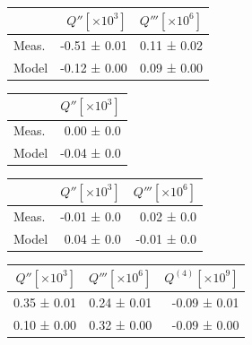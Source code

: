 \begin{figure}
    \centering
    \begin{minipage}[b]{0.49\textwidth}
        \centering
        \begin{table}
          \footnotesize
          \begin{tabular}{lrr}
            & $Q'' [\times 10^3]$ & $Q''' [\times 10^6]$ \\
            \midrule
            Meas.       &  -0.51 ± 0.01 & 0.11 ± 0.02\\
            Model       &  -0.12 ± 0.00 & 0.09 ± 0.00\\
            \bottomrule
          \end{tabular}
        \end{table}
    \end{minipage}
    \hfill
    \begin{minipage}[b]{0.49\textwidth}
        \centering
        \begin{table}
          \footnotesize
          \begin{tabular}{lr}
          & $Q'' [\times 10^3]$ \\
          \midrule
          Meas.       &  0.00 ± 0.0 \\
          Model       & -0.04 ± 0.0 \\
          \bottomrule
          \end{tabular}
        \end{table}
    \end{minipage}
\end{figure}

\begin{figure}
    \centering
    \begin{minipage}[b]{0.49\textwidth}
        \centering
        \begin{table}
          \begin{tabular}{lrr}
            & $Q'' [\times 10^3]$ & $Q''' [\times 10^6]$ \\
            \midrule
              Meas. & -0.01 ± 0.0 &  0.02 ± 0.0 \\
              Model &  0.04 ± 0.0 & -0.01 ± 0.0 \\
            \bottomrule
            \end{tabular}
        \end{table}
    \end{minipage}
    \hfill
    \begin{minipage}[b]{0.49\textwidth}
        \centering
        \begin{table}
          \begin{tabular}{rrr}
            $Q'' [\times 10^3]$ & $Q''' [\times 10^6]$ & $Q^{(4)} [\times 10^9]$ \\
            \midrule
             0.35 ± 0.01 & 0.24 ± 0.01 & -0.09 ± 0.01 \\
             0.10 ± 0.00 & 0.32 ± 0.00 & -0.09 ± 0.00 \\
            \bottomrule
            \end{tabular}
        \end{table}
    \end{minipage}
\end{figure}


